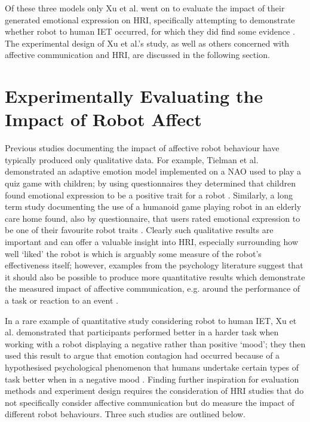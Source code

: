 \documentclass[11pt,a4paper]{report}
\begin{document}
Of these three models only Xu et al. went on to evaluate the impact of their generated emotional expression on HRI, specifically attempting to demonstrate whether robot to human IET occurred, for which they did find some evidence \cite{xu2014robot}. The experimental design of Xu et al.'s study, as well as others concerned with affective communication and HRI, are discussed in the following section.

\section{Experimentally Evaluating the Impact of Robot Affect}

Previous studies documenting the impact of affective robot behaviour have typically produced only qualitative data. For example, Tielman et al. demonstrated an adaptive emotion model implemented on a NAO used to play a quiz game with children; by using questionnaires they determined that children found emotional expression to be a positive trait for a robot \cite{tielman2014adaptive}. Similarly, a long term study documenting the use of a humanoid game playing robot in an elderly care home found, also by questionnaire, that users rated emotional expression to be one of their favourite robot traits \cite{louie2012playing}. Clearly such qualitative results are important and can offer a valuable insight into HRI, especially surrounding how well `liked' the robot is which is arguably some measure of the robot's effectiveness itself; however, examples from the psychology literature suggest that it should also be possible to produce more quantitative results which demonstrate the measured impact of affective communication, e.g. around the performance of a task \cite{barsade2002ripple} or reaction to an event \cite{latane1968group}.

In a rare example of quantitative study considering robot to human IET, Xu et al. demonstrated that participants performed better in a harder task when working with a robot displaying a negative rather than positive `mood'; they then used this result to argue that emotion contagion had occurred because of a hypothesised psychological phenomenon that humans undertake certain types of task better when in a negative mood \cite{xu2014robot}. Finding further inspiration for evaluation methods and experiment design requires the consideration of HRI studies that do not specifically consider affective communication but do measure the impact of different robot behaviours. Three such studies are outlined below.
\end{document}
